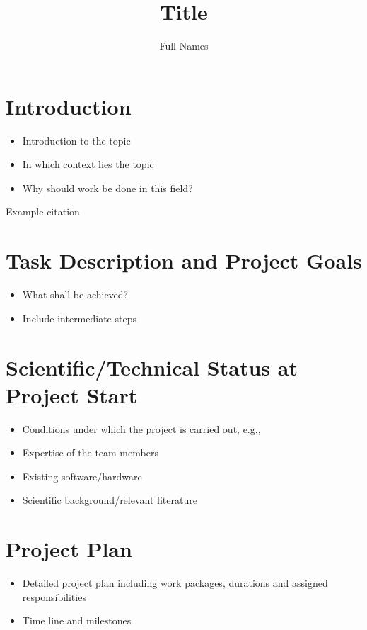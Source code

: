 \documentclass[cover]{ams-project}
\title{Title}
\author{Full Names}
\begin{document}
\maketitle

\begin{abstract}
\blindtext[1]
\end{abstract}

\clearpage
\tableofcontents
\cleardoublepage

\section[Introduction]{Introduction}
\begin{itemize}
	\item Introduction to the topic
	\item In which context lies the topic
	\item Why should work be done in this field?
\end{itemize}

Example citation~\cite{RaspiPower}


\section{Task Description and Project Goals}
\begin{itemize}
	\item What shall be achieved?
	\item Include intermediate steps
\end{itemize}


\section{Scientific/Technical Status at Project Start}
\begin{itemize}
	\item Conditions under which the project is carried out, e.g.,
	\item Expertise of the team members
	\item Existing software/hardware
	\item Scientific background/relevant literature
\end{itemize}


\section{Project Plan}
\begin{itemize}
	\item Detailed project plan including work packages, durations and assigned responsibilities
	\item Time line and milestones
\end{itemize}
\end{document}
